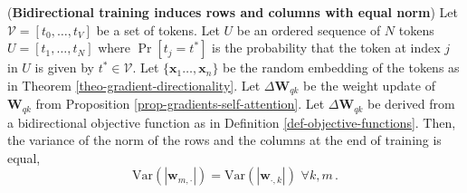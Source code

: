 \begin{corollary}
%
(\textbf{Bidirectional training induces rows and columns with equal norm})
%
Let $\mathcal{V} = [t_0, \dots, t_V]$ be a set of tokens.
%
Let $U$ be an ordered sequence of $N$ tokens $U = [t_1, \dots, t_N]$ where $\Pr[t_j = t^*]$ is the probability that the token at index $j$ in $U$ is given by $t^* \in \mathcal{V}$.
%
Let $\{\bm{x}_1 \dots, \bm{x}_n\}$ be the random embedding of the tokens as in Theorem \ref{theo-gradient-directionality}.
%
Let $\Delta \bm{W}_{qk}$ be the weight update of $\bm{W}_{qk}$ from Proposition \ref{prop-gradients-self-attention}.
%
Let $\Delta \bm{W}_{qk}$ be derived from a bidirectional objective function as in Definition \ref{def-objective-functions}.
%
Then, the variance of the norm of the rows and the columns at the end of training is equal,
%
%
\begin{equation}
    \text{Var}\left(|\bm{w}_{m, \cdot}|\right) =\text{Var}\left(|\bm{w}_{ \cdot, k}|\right) \,\, \forall k,m \,.
\end{equation}
%
\end{corollary}